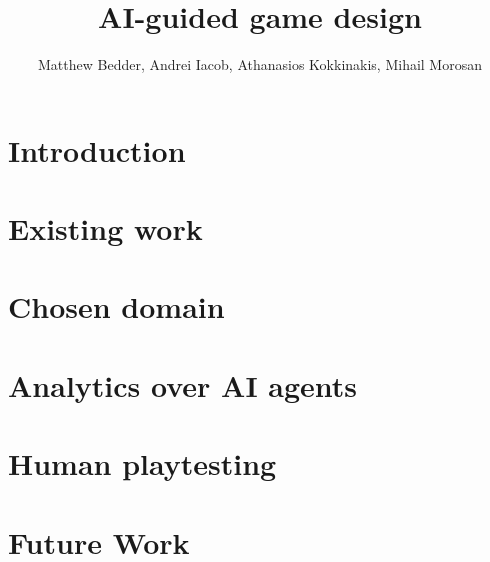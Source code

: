 \documentclass[9pt]{IEEEtran}
\title{AI-guided game design}
\author{Matthew Bedder, Andrei Iacob, Athanasios Kokkinakis, Mihail Morosan}
\begin{document}
\maketitle
\section{Introduction}

\section{Existing work}

\section{Chosen domain}

\section{Analytics over AI agents}

\section{Human playtesting}

\section{Future Work}


\printbibliography[heading=bibnumbered]
\end{document}
